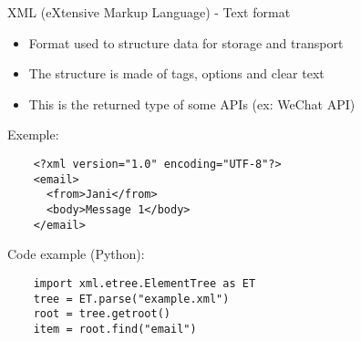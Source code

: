 \documentclass[handout]{beamer}[10pt, usepdftitle=false]
\begin{document}
	\begin{frame}[fragile]
	
	XML (eXtensive Markup Language) - Text format	
	
	\vspace*{0.6em}
	\begin{itemize}
	\item{Format used to structure data for storage and transport}
	\item{The structure is made of tags, options and clear text}
	\item{This is the returned type of some APIs (ex: WeChat API)}	
	\end{itemize}
	
	Exemple:
	\begin{verbatim}
	<?xml version="1.0" encoding="UTF-8"?>
	<email>
	  <from>Jani</from>
	  <body>Message 1</body>
	</email> 
	\end{verbatim}		
	
	Code example (Python):
	\begin{verbatim}
	import xml.etree.ElementTree as ET 
	tree = ET.parse("example.xml")
	root = tree.getroot() 
	item = root.find("email")
	\end{verbatim}
	
	\end{frame}
	
\end{document}
